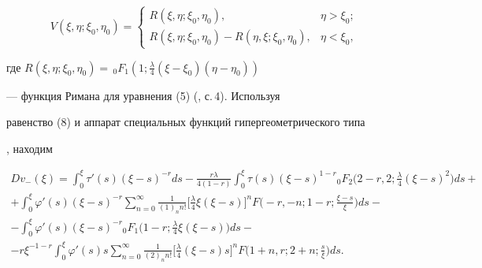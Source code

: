 $$ 


V(\xi,\eta;\xi_0,\eta_0)= 


\begin{cases} 


R(\xi,\eta;\xi_0,\eta_0), & \eta>\xi_0; \\ 


R(\xi,\eta;\xi_0,\eta_0)-R(\eta,\xi;\xi_0,\eta_0), 


& \eta<\xi_0, 


\end{cases} 


$$ 


где $R(\xi,\eta;\xi_0,\eta_0)=\,{}_0F_1(1;\frac{\lambda}{4} 


(\xi-\xi_0)(\eta-\eta_0))$ 


--- функция Римана для уравнения (5) (\cite{2}, с.\,4). Используя 


равенство (8) и аппарат специальных функций гипергеометрического типа 


\cite{3}, находим 


\begin{multline} 


D v_-(\xi)=\int^\xi_0 \tau'(s)(\xi-s)^{-r}ds- 


\frac{r\lambda}{4(1-r)}\int^\xi_0 \tau(s)(\xi-s)^{1-r} 


{}_0F_2\bigg(2-r,2;\frac{\lambda}{4}(\xi-s)^2\bigg)ds+ \\ 


% 


+\int^\xi_0 \varphi'(s)(\xi-s)^{-r}\sum^\infty_{n=0} 


\frac{1}{(1)_n n!}\bigg[\frac{\lambda}{4} 


\xi(\xi-s)\bigg]^n F\bigg(-r,-n;1-r; 


\frac{\xi-s}{\xi}\bigg)ds - \\ 


% 


-\int^\xi_0 \varphi'(s)(\xi-s)^{-r}{}_0F_1 


\bigg(1-r;\frac{\lambda}{4}\xi(\xi-s)\bigg)ds - \\


% 


-r\xi^{-1-r}\int^\xi_0 \varphi'(s)s\sum^\infty_{n=0} 


\frac{1}{(2)_n n!}\bigg[\frac{\lambda}{4}(\xi-s)s \bigg]^n 


F\bigg(1+n,r;2+n;\frac{s}{\xi} \bigg)ds. 


\end{multline} 


